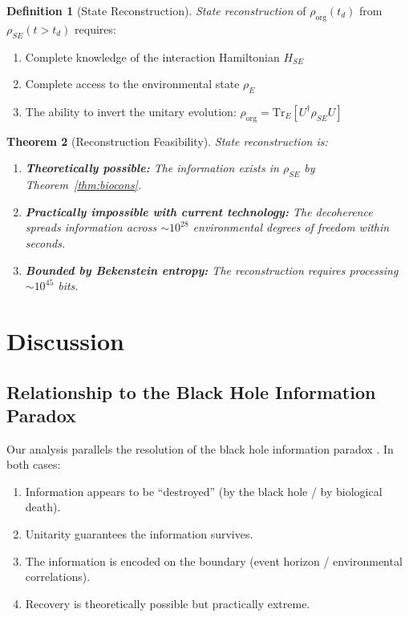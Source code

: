 \documentclass[12pt, a4paper]{article}
\theoremstyle{plain}
\newtheorem{theorem}{Theorem}[section]
\theoremstyle{definition}
\newtheorem{definition}[theorem]{Definition}
\theoremstyle{remark}
\begin{document}
\begin{definition}[State Reconstruction]\label{def:reconstruction}
  \emph{State reconstruction} of $\rho_{\text{org}}(t_d)$ from
  $\rho_{SE}(t > t_d)$ requires:
  \begin{enumerate}[label=(\roman*)]
    \item Complete knowledge of the interaction Hamiltonian $H_{SE}$
    \item Complete access to the environmental state $\rho_E$
    \item The ability to invert the unitary evolution:
      $\rho_{\text{org}} = \text{Tr}_E[U^\dagger \rho_{SE} U]$
  \end{enumerate}
\end{definition}

\begin{theorem}[Reconstruction Feasibility]\label{thm:reconstruction}
  State reconstruction is:
  \begin{enumerate}[label=(\alph*)]
    \item \textbf{Theoretically possible:} The information exists in
      $\rho_{SE}$ by Theorem~\ref{thm:biocons}.
    \item \textbf{Practically impossible with current technology:}
      The decoherence spreads information across $\sim 10^{28}$
      environmental degrees of freedom within seconds.
    \item \textbf{Bounded by Bekenstein entropy:} The reconstruction
      requires processing $\sim 10^{45}$ bits.
  \end{enumerate}
\end{theorem}

\section{Discussion}\label{sec:discussion}

\subsection{Relationship to the Black Hole Information Paradox}

Our analysis parallels the resolution of the black hole information
paradox \citep{Hawking2005}. In both cases:
\begin{enumerate}
  \item Information appears to be ``destroyed'' (by the black hole /
    by biological death).
  \item Unitarity guarantees the information survives.
  \item The information is encoded on the boundary (event horizon /
    environmental correlations).
  \item Recovery is theoretically possible but practically extreme.
\end{enumerate}
\end{document}
